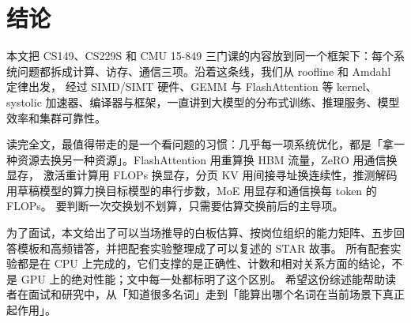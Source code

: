 \section{结论}
\label{sec:conclusion}

本文把 CS149、CS229S 和 CMU 15-849 三门课的内容放到同一个框架下：每个系统问题都拆成计算、访存、通信三项。沿着这条线，我们从 roofline 和 Amdahl 定律出发，
经过 SIMD/SIMT 硬件、GEMM 与 FlashAttention 等 kernel、systolic 加速器、编译器与框架，一直讲到大模型的分布式训练、推理服务、模型效率和集群可靠性。

读完全文，最值得带走的是一个看问题的习惯：几乎每一项系统优化，都是「拿一种资源去换另一种资源」。FlashAttention 用重算换 HBM 流量，ZeRO 用通信换显存，
激活重计算用 FLOPs 换显存，分页 KV 用间接寻址换连续性，推测解码用草稿模型的算力换目标模型的串行步数，MoE 用显存和通信换每 token 的 FLOPs。
要判断一次交换划不划算，只需要估算交换前后的主导项。

为了面试，本文给出了可以当场推导的白板估算、按岗位组织的能力矩阵、五步回答模板和高频错答，并把配套实验整理成了可以复述的 STAR 故事。
所有配套实验都是在 CPU 上完成的，它们支撑的是正确性、计数和相对关系方面的结论，不是 GPU 上的绝对性能；文中每一处都标明了这个区别。
希望这份综述能帮助读者在面试和研究中，从「知道很多名词」走到「能算出哪个名词在当前场景下真正起作用」。

